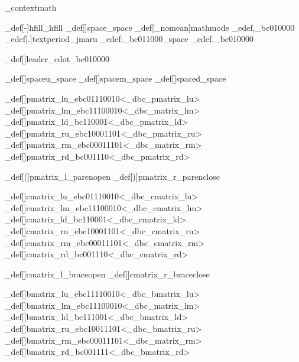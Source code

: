 \brl@char_context{math}

\brl@char_def[-]{hfill}{\brl@char@alias_hfill}%
\brl@char_def[]{space}{\brl@char@alias_space}%
\brl@char_def[\brl@char_nomean]{mathmode}{}%
\brl@char_edef{,}{\brl@char_bc010000\brl@char@spacetrue}%
\brl@char_edef[.]{textperiod}{\brl@char@alias_jmaru\brl@char@spacetrue}%
\brl@char_edef{;}{\brl@char_bc011000\brl@char@alias_space}
\brl@char_edef{.}{\brl@char_bc010000}


\brl@char_def[]{leader_cdot}{\brl@char_bc010000}





\brl@char_def[]{spaceu}{\brl@char@alias_space}%
\brl@char_def[]{spacem}{\brl@char@alias_space}%
\brl@char_def[]{spaced}{\brl@char@alias_space}%


\brl@char_def[]{pmatrix_lu}{\brl@char_ebc01110010}<\brl@char@alias_dbc_pmatrix_lu>
\brl@char_def[]{pmatrix_lm}{\brl@char_ebc11100010}<\brl@char@alias_dbc_matrix_lm>
\brl@char_def[]{pmatrix_ld}{\brl@char_bc110001}<\brl@char@alias_dbc_pmatrix_ld>
\brl@char_def[]{pmatrix_ru}{\brl@char_ebc10001101}<\brl@char@alias_dbc_pmatrix_ru>
\brl@char_def[]{pmatrix_rm}{\brl@char_ebc00011101}<\brl@char@alias_dbc_matrix_rm>
\brl@char_def[]{pmatrix_rd}{\brl@char_bc001110}<\brl@char@alias_dbc_pmatrix_rd>

\brl@char_def[(]{pmatrix_l}{\brl@char@alias_parenopen}
\brl@char_def[)]{pmatrix_r}{\brl@char@alias_parenclose}

\brl@char_def[]{cmatrix_lu}{\brl@char_ebc01110010}<\brl@char@alias_dbc_cmatrix_lu>
\brl@char_def[]{cmatrix_lm}{\brl@char_ebc11100010}<\brl@char@alias_dbc_cmatrix_lm>
\brl@char_def[]{cmatrix_ld}{\brl@char_bc110001}<\brl@char@alias_dbc_cmatrix_ld>
\brl@char_def[]{cmatrix_ru}{\brl@char_ebc10001101}<\brl@char@alias_dbc_cmatrix_ru>
\brl@char_def[]{cmatrix_rm}{\brl@char_ebc00011101}<\brl@char@alias_dbc_cmatrix_rm>
\brl@char_def[]{cmatrix_rd}{\brl@char_bc001110}<\brl@char@alias_dbc_cmatrix_rd>

\brl@char_def[]{cmatrix_l}{\brl@char@alias_braceopen}
\brl@char_def[]{cmatrix_r}{\brl@char@alias_braceclose}


\brl@char_def[]{bmatrix_lu}{\brl@char_ebc11110010}<\brl@char@alias_dbc_bmatrix_lu>
\brl@char_def[]{bmatrix_lm}{\brl@char_ebc11100010}<\brl@char@alias_dbc_matrix_lm>
\brl@char_def[]{bmatrix_ld}{\brl@char_bc111001}<\brl@char@alias_dbc_bmatrix_ld>
\brl@char_def[]{bmatrix_ru}{\brl@char_ebc10011101}<\brl@char@alias_dbc_bmatrix_ru>
\brl@char_def[]{bmatrix_rm}{\brl@char_ebc00011101}<\brl@char@alias_dbc_matrix_rm>
\brl@char_def[]{bmatrix_rd}{\brl@char_bc001111}<\brl@char@alias_dbc_bmatrix_rd>

